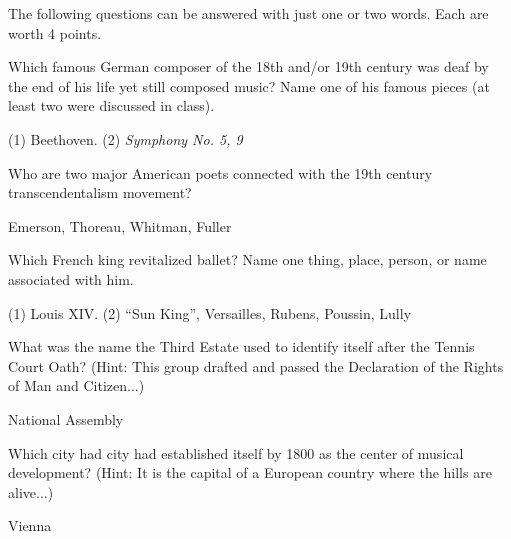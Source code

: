 \documentclass[12pt]{examdesign}
\begin{document}
\begin{shortanswer}[title={Short Answers}]
	The following questions can be answered with just one or two words. Each are worth 4 points.

	\begin{question}
		Which famous German composer of the 18th and/or 19th century was deaf by the end of his life yet still composed music? Name one of his famous pieces (at least two were discussed in class).
		\examvspace{0.5 in}
		\begin{answer}
			(1) Beethoven. (2) \emph{Symphony No. 5, 9}
		\end{answer}
	\end{question}

	\begin{question}
		Who are two major American poets connected with the 19th century transcendentalism movement?
		\examvspace{0.5 in}
		\begin{answer}
			Emerson, Thoreau, Whitman, Fuller
		\end{answer}
	\end{question}

	\begin{question}
		Which French king revitalized ballet? Name one thing, place, person, or name associated with him.
		\examvspace{0.5 in}
		\begin{answer}
			(1) Louis XIV. (2) ``Sun King'', Versailles, Rubens, Poussin, Lully
		\end{answer}
	\end{question}

	\begin{question}
		What was the name the Third Estate used to identify itself after the Tennis Court Oath? (Hint: This group drafted and passed the Declaration of the Rights of Man and Citizen...)
		\examvspace{0.5 in}
		\begin{answer}
			National Assembly
		\end{answer}
	\end{question}

	\begin{question}
		Which city had city had established itself by 1800 as the center of musical development? (Hint: It is the capital of a European country where the hills are alive...)
		\examvspace{0.5 in}
		\begin{answer}
			Vienna
		\end{answer}
	\end{question}
\end{shortanswer}
\end{document}
